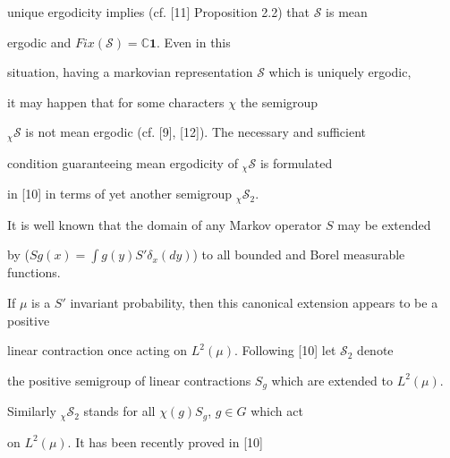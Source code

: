 \documentclass{amsart}
\theoremstyle{definition}
\theoremstyle{remark}
\numberwithin{equation}{section}
\begin{document}
unique ergodicity implies (cf. [11] Proposition 2.2) that $\mathcal{S}$ is mean

ergodic and $Fix(\mathcal{S}) = \mathbb{C}\mathbf{1}$. Even in this

situation, having a markovian representation $\mathcal{S}$ which is uniquely ergodic,

it may happen that for some characters $\chi $ the semigroup

$_{\chi}\mathcal{S}$  is not mean ergodic (cf. [9], [12]). The necessary and sufficient

condition guaranteeing mean ergodicity of $_{\chi}\mathcal{S}$ is formulated

in [10] in terms of yet another semigroup $_{\chi}\mathcal{S}_2$.

It is well known that the domain of any Markov operator $S$ may be  extended

by ($Sg(x) = \int g(y) S'\delta_x(dy)$)  to  all bounded and Borel measurable functions.

If $\mu $ is a $S'$ invariant probability, then this canonical extension appears to be a positive

linear contraction once acting on $L^2(\mu)$. Following [10] let $\mathcal{S}_2$ denote

the positive semigroup of linear contractions $S_g$ which are extended to $L^2(\mu )$.

Similarly $_{\chi}\mathcal{S}_2$ stands for all $\chi(g)S_g$, $g\in G$ which act

on $L^2(\mu )$. It has been recently proved in [10]
\end{document}
